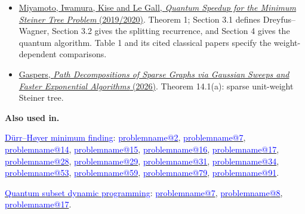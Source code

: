 \documentclass[11pt,a4paper]{article}
\makeatletter
\theoremstyle{problemstyle}
\newenvironment{algorithmindex}[1]{%
  \begin{itemize}[label=\textbullet,leftmargin=1.3em,labelsep=0.6em,itemsep=4pt,topsep=3pt,parsep=0pt]
  \small
}{\end{itemize}}
\newcommand{\problemref}[1]{\hyperref[entry:#1]{\textcolor{blue}{\csname problemname@#1\endcsname}}}
\newcommand{\algorithmref}[2]{\hyperref[algorithm:#1]{\textcolor{blue}{#2}}}
\makeatother
\begin{document}
\begin{algorithmindex}{11}
\item \href{https://arxiv.org/pdf/1904.03581}{Miyamoto, Iwamura, Kise and Le Gall, \emph{Quantum Speedup for the Minimum Steiner Tree Problem} (2019/2020)}. Theorem 1; Section 3.1 defines Dreyfus--Wagner, Section 3.2 gives the splitting recurrence, and Section 4 gives the quantum algorithm. Table 1 and its cited classical papers specify the weight-dependent comparisons.
\item \href{https://serggasp.github.io/pathwidth-site/papers/sparse-pathwidth/14-apps-connectivity.html}{Gaspers, \emph{Path Decompositions of Sparse Graphs via Gaussian Sweeps and Faster Exponential Algorithms} (2026)}. Theorem 14.1(a): sparse unit-weight Steiner tree.
\end{algorithmindex}
\par{}\begingroup\small
\textbf{Also used in.}
\par\algorithmref{minimum-finding}{D\"urr--H{\o}yer minimum finding}: \problemref{2}, \problemref{7}, \problemref{14}, \problemref{15}, \problemref{16}, \problemref{17}, \problemref{28}, \problemref{29}, \problemref{31}, \problemref{34}, \problemref{53}, \problemref{59}, \problemref{79}, \problemref{91}.
\par\algorithmref{subset-dp}{Quantum subset dynamic programming}: \problemref{7}, \problemref{8}, \problemref{17}.
\par\endgroup
\end{document}

